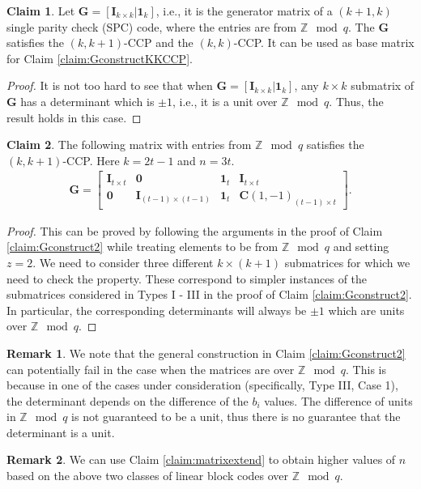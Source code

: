 \documentclass[journal,twocolumn]{IEEEtran}
\theoremstyle{definition}
\newtheorem{claim}{Claim}
\newtheorem{remark}{Remark}
\newcommand{\bfG}{\mathbf{G}}
\newcommand{\bfI}{\mathbf{I}}
\newcommand{\bfC}{\mathbf{C}}
\newcommand{\bfzr}{\mathbf{0}}
\newcommand{\bfoe}{\mathbf{1}}
\begin{document}
\begin{claim}
	\label{claim:SPC_CCPZmodq}
Let $\bfG = [\bfI_{k \times k} | \bfoe_k]$, i.e., it is the generator matrix of a $(k+1, k)$ single parity check (SPC) code, where the entries are from $\mathbb{Z} \mod q$.
The $\bfG$ satisfies the $(k,k+1)$-CCP and the $(k,k)$-CCP. It can be used as base matrix for  Claim \ref{claim:GconstructKKCCP}.
\end{claim}
\begin{proof}
It is not too hard to see that when $\bfG = [\bfI_{k \times k} | \bfoe_k]$, any $k \times k$ submatrix of $\bfG$ has a determinant which is $\pm 1$, i.e., it is a unit over $\mathbb{Z} \mod q$. Thus, the result holds in this case.
\end{proof}
\begin{claim}
\label{claim:z_2_Zmodq}
The following matrix with entries from $\mathbb{Z}\mod q$ satisfies the $(k,k+1)$-CCP. Here $k =2t-1$ and $n=3t$.
\begin{align*}
    \bfG = \begin{bmatrix}
	   \bfI_{t \times t}& \bfzr & \bfoe_t & \bfI_{t \times t}\\
    	 \bfzr &\bfI_{(t-1) \times (t-1)}& \bfoe_t & \bfC(1,-1)_{(t-1) \times t}
	\end{bmatrix}.
\end{align*}
\end{claim}
\begin{proof}
This can be proved by following the arguments in the proof of Claim \ref{claim:Gconstruct2} while treating elements to be from $\mathbb{Z} \mod q$ and setting $z=2$. We need to consider three different $k \times (k+1)$ submatrices for which we need to check the property. These correspond to simpler instances of the submatrices considered in Types I - III in the proof of Claim \ref{claim:Gconstruct2}. In particular, the corresponding determinants will always be $\pm 1$ which are units over $\mathbb{Z} \mod q$.
\end{proof}
\begin{remark}
We note that the general construction in Claim \ref{claim:Gconstruct2} can potentially fail in the case when the matrices are over $\mathbb{Z} \mod q$. This is because in one of the cases under consideration (specifically, Type III, Case 1), the determinant depends on the difference of the $b_i$ values. The difference of units in $\mathbb{Z} \mod q$ is not guaranteed to be a unit, thus there is no guarantee that the determinant is a unit.
\end{remark}
\begin{remark}
We can use Claim \ref{claim:matrixextend} to obtain higher values of $n$ based on the above two classes of linear block codes over $\mathbb{Z} \mod q$.
\end{remark}
\end{document}
